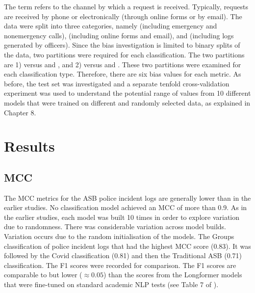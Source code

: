 The term refers to the channel by which a request is received. Typically, requests are received by phone or electronically (through online forms or by email). The data were split into three categories, namely  (including emergency and nonemergency calls),  (including online forms and email), and (including logs generated by officers). Since the bias investigation is limited to binary splits of the data, two partitions were required for each classification. The two partitions are 1)  versus  and , and 2)  versus  and . These two partitions were examined for each classification type. Therefore, there are six bias values for each metric. As before, the test set was investigated and a separate tenfold cross-validation experiment was used to understand the potential range of values from 10 different models that were trained on different and randomly selected data, as explained in Chapter 8.


\section{Results}

\subsection{MCC} The MCC metrics for the ASB police incident logs are generally lower than in the earlier studies. No classification model achieved an MCC of more than 0.9. As in the earlier studies, each model was built 10 times in order to explore variation due to randomness. There was considerable variation across model builds. Variation occurs due to the random initialisation of the models. The Groups classification of police incident logs that had the highest MCC score (0.83). It was followed by the Covid classification (0.81) and then the Traditional ASB (0.71) classification. The F1 scores were recorded for comparison. The F1 scores are comparable to but lower ($\approx 0.05$) than the scores from the Longformer models that were fine-tuned on standard academic NLP tests (see Table 7 of \textcite{beltagy2020longformer}). 

